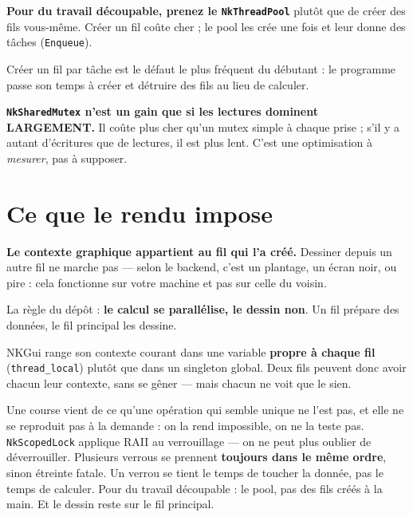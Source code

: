 \begin{nkretenir}
\textbf{Pour du travail découpable, prenez le \texttt{NkThreadPool}} plutôt que
de créer des fils vous-même. Créer un fil coûte cher ; le pool les crée une fois
et leur donne des tâches (\texttt{Enqueue}).

Créer un fil par tâche est le défaut le plus fréquent du débutant : le programme
passe son temps à créer et détruire des fils au lieu de calculer.
\end{nkretenir}

\begin{nkpiege}
\textbf{\texttt{NkSharedMutex} n'est un gain que si les lectures dominent
LARGEMENT.} Il coûte plus cher qu'un mutex simple à chaque prise ; s'il y a
autant d'écritures que de lectures, il est plus lent. C'est une optimisation à
\emph{mesurer}, pas à supposer.
\end{nkpiege}

\section{Ce que le rendu impose}

\begin{nkpiege}
\textbf{Le contexte graphique appartient au fil qui l'a créé.} Dessiner depuis un
autre fil ne marche pas --- selon le backend, c'est un plantage, un écran noir,
ou pire : cela fonctionne sur votre machine et pas sur celle du voisin.

La règle du dépôt : \textbf{le calcul se parallélise, le dessin non}. Un fil
prépare des données, le fil principal les dessine.
\end{nkpiege}

\begin{nkretenir}
NKGui range son contexte courant dans une variable \textbf{propre à chaque fil}
(\texttt{thread\_local}) plutôt que dans un singleton global. Deux fils peuvent
donc avoir chacun leur contexte, sans se gêner --- mais chacun ne voit que le
sien.
\end{nkretenir}

\begin{nkbilan}
Une course vient de ce qu'une opération qui semble unique ne l'est pas, et elle
ne se reproduit pas à la demande : on la rend impossible, on ne la teste pas.
\texttt{NkScopedLock} applique RAII au verrouillage --- on ne peut plus oublier
de déverrouiller. Plusieurs verrous se prennent \textbf{toujours dans le même
ordre}, sinon étreinte fatale. Un verrou se tient le temps de toucher la donnée,
pas le temps de calculer. Pour du travail découpable : le pool, pas des fils
créés à la main. Et le dessin reste sur le fil principal.
\end{nkbilan}

